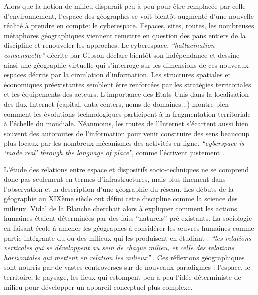 Alors que la notion de milieu disparait peu à peu pour être remplacée par celle d’environnement\citep{DAngio2001}, l’espace des géographes se voit bientôt augmenté d’une nouvelle réalité à prendre en compte: le cyberespace. Espaces, sites, routes, les nombreuses métaphores géographiques viennent remettre en question des pans entiers de la discipline et renouveler les approches. Le cyberespace, \textit{“hallucination consensuelle”} décrite par Gibson \citep{Gibson1984} déclare bientôt son indépendance \citep{Barlow2001} et dessine ainsi une géographie virtuelle \citep{Batty1997} qui s’interroge sur les dimensions de ces nouveaux espaces décrits par la circulation d’information. Les structures spatiales et économiques préexistantes semblent être renforcées par les stratégies territoriales et les équipements des acteurs. L’importance des Etats-Unis \citep{Zook2001, Cukier1999} dans la localisation des flux Internet (capital, data centers, noms de domaines...) montre bien comment les évolutions technologiques participent à la fragmentation territoriale à l’échelle du mondiale. Néanmoins, les routes de l’Internet s’écartent aussi bien souvent des autoroutes de l’information pour venir construire des sens beaucoup plus locaux par les nombreux mécanismes des activités en ligne. \textit{“cyberspace is ‘made real’ through the language of place”}, comme l’écrivent justement \cite{Dodge2007}.

L’étude des relations entre espace et dispositifs socio-techniques ne se comprend donc pas seulement en termes d’infrastructures, mais plus finement dans l’observation et la description d’une géographie du réseau. Les débuts de la géographie au XIXème siècle ont défini cette discipline comme la science des milieux. Vidal de la Blanche cherchait alors à expliquer comment les actions humaines étaient déterminées par des faits “naturels” pré-existants. La sociologie en faisant école à amener les géographes à considérer les œuvres humaines comme partie intégrante du ou des milieux qui les produisent \citep{Demangeot1984} en étudiant : \textit{“les relations verticales qui se développent au sein de chaque milieu, et celle des relations horizontales qui mettent en relation les milieux”} \citep{Claval1990}. Ces réflexions géographiques sont nourris par de vastes controverses sur de nouveaux paradigmes : l'espace, le territoire, le paysage, les lieux qui estompent peu à peu l’idée déterministe de milieu pour développer un appareil conceptuel plus complexe. 

